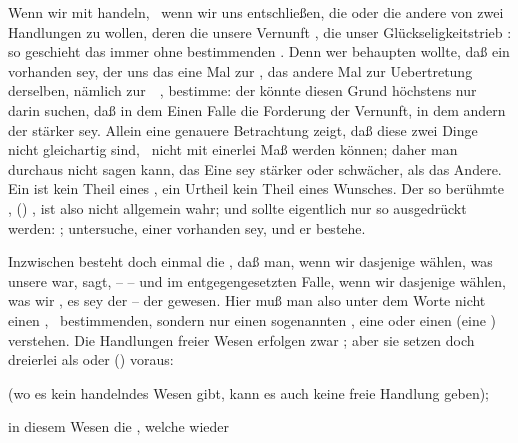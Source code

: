 \begin{aufza}
\item Wenn wir mit  handeln, \dh\ wenn wir uns entschließen, die  oder die andere von zwei Handlungen zu wollen, deren die  unsere Vernunft , die  unser Glückseligkeitstrieb : so geschieht das immer ohne bestimmenden . Denn wer behaupten wollte, daß ein  vorhanden sey, der uns das eine Mal zur , das andere Mal zur Uebertretung derselben, nämlich zur~\ , bestimme: der könnte diesen Grund höchstens nur darin suchen, daß in dem Einen Falle die Forderung der Vernunft, in dem andern der  stärker sey. Allein eine genauere Betrachtung zeigt, daß diese zwei Dinge nicht gleichartig sind, \dh\ nicht mit einerlei Maß  werden können; daher man durchaus nicht sagen kann, das Eine sey stärker oder schwächer, als das Andere. Ein  ist kein Theil eines , ein Urtheil kein Theil eines Wunsches. Der so berühmte , () , ist also nicht allgemein wahr; und sollte eigentlich nur so ausgedrückt werden: ; untersuche,  einer vorhanden sey, und  er bestehe.
\item Inzwischen besteht doch einmal die , daß man, wenn wir dasjenige wählen, was unsere  war, sagt,  -- -- und im entgegengesetzten Falle, wenn wir dasjenige wählen, was wir , es sey der  -- der  gewesen. Hier muß man also unter dem Worte  nicht einen , \dh\ bestimmenden, sondern nur einen  sogenannten , eine  oder einen  (eine ) verstehen. Die Handlungen freier Wesen erfolgen zwar ; aber sie setzen doch dreierlei als  oder  () voraus: 
\begin{inparaenum}[a)] 
\item {} (wo es kein handelndes Wesen gibt, kann es auch keine freie Handlung geben); 
\item in diesem Wesen die , welche wieder 

\end{inparaenum}
\end{aufza}
